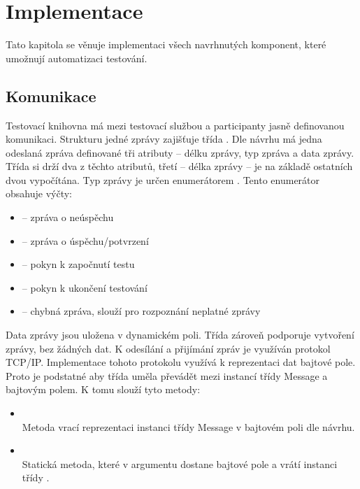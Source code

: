 \chapter{Implementace}

Tato kapitola se věnuje implementaci všech navrhnutých komponent, které umožnují automatizaci testování.

\section{Komunikace}
Testovací knihovna má mezi testovací službou a participanty jasně definovanou komunikaci. Strukturu jedné zprávy zajišťuje třída . Dle návrhu má jedna odeslaná zpráva definované tři atributy -- délku zprávy, typ zpráva a data zprávy. Třída  si drží dva z těchto atributů, třetí -- délka zprávy -- je na základě ostatních dvou vypočítána. Typ zprávy je určen enumerátorem . Tento enumerátor obsahuje výčty:

\begin{itemize} 
    \item {} -- zpráva o neúspěchu
    \item {} -- zpráva o úspěchu/potvrzení
    \item {} -- pokyn k započnutí testu
    \item {} -- pokyn k ukončení testování
    \item {} -- chybná zpráva, slouží pro rozpoznání neplatné zprávy
\end{itemize}

Data zprávy jsou uložena v dynamickém poli. Třída zároveň podporuje vytvoření zprávy, bez žádných dat. K odesílání a přijímání zpráv je využíván protokol TCP/IP. Implementace tohoto protokolu využívá k reprezentaci dat bajtové pole. Proto je podstatné aby třída  uměla převádět mezi instancí třídy Message a bajtovým polem. K tomu slouží tyto metody:

\begin{itemize}
    \item {} \\ Metoda vrací reprezentaci instanci třídy Message v bajtovém poli dle návrhu.
    \item {} \\ Statická metoda, které v argumentu dostane bajtové pole a vrátí instanci třídy .
\end{itemize}


